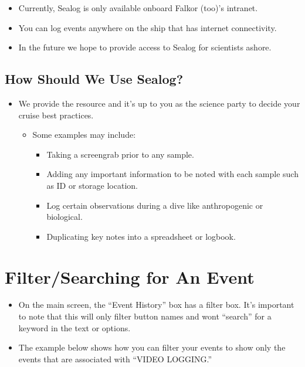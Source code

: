 \documentclass[
  letterpaper,
  DIV=11,
  numbers=noendperiod]{scrreprt}
\providecommand{\tightlist}{%
  \setlength{\itemsep}{0pt}\setlength{\parskip}{0pt}}\usepackage{longtable,booktabs,array}
\begin{document}
\begin{itemize}
\tightlist
\item
  Currently, Sealog is only available onboard Falkor (too)'s intranet.
\item
  You can log events anywhere on the ship that has internet
  connectivity.
\item
  In the future we hope to provide access to Sealog for scientists
  ashore.
\end{itemize}

\hypertarget{how-should-we-use-sealog}{%
\subsection{How Should We Use Sealog?}\label{how-should-we-use-sealog}}

\begin{itemize}
\tightlist
\item
  We provide the resource and it's up to you as the science party to
  decide your cruise best practices.

  \begin{itemize}
  \tightlist
  \item
    Some examples may include:

    \begin{itemize}
    \tightlist
    \item
      Taking a screengrab prior to any sample.
    \item
      Adding any important information to be noted with each sample such
      as ID or storage location.
    \item
      Log certain observations during a dive like anthropogenic or
      biological.
    \item
      Duplicating key notes into a spreadsheet or logbook.
    \end{itemize}
  \end{itemize}
\end{itemize}

\hypertarget{filtersearching-for-an-event}{%
\section{Filter/Searching for An
Event}\label{filtersearching-for-an-event}}

\begin{itemize}
\tightlist
\item
  On the main screen, the ``Event History'' box has a filter box. It's
  important to note that this will only filter button names and wont
  ``search'' for a keyword in the text or options.
\item
  The example below shows how you can filter your events to show only
  the events that are associated with ``VIDEO LOGGING.''
\end{itemize}
\end{document}
